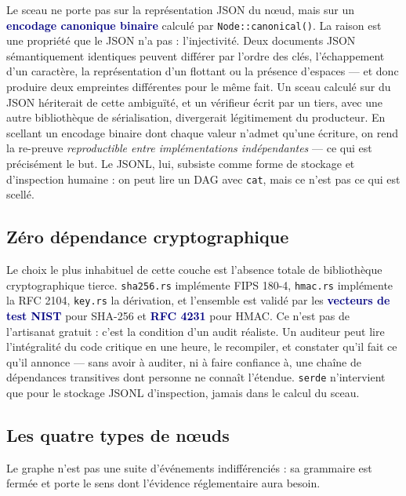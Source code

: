 \documentclass[10pt]{article}
\newcommand{\code}[1]{\texttt{\small #1}}
\newcommand{\mm}[1]{\textbf{\textcolor{navy}{#1}}}
\begin{document}
Le sceau ne porte pas sur la représentation JSON du nœud, mais sur un \mm{encodage canonique binaire} calculé par \code{Node::canonical()}. La raison est une propriété que le JSON n'a pas : l'injectivité. Deux documents JSON sémantiquement identiques peuvent différer par l'ordre des clés, l'échappement d'un caractère, la représentation d'un flottant ou la présence d'espaces — et donc produire deux empreintes différentes pour le même fait. Un sceau calculé sur du JSON hériterait de cette ambiguïté, et un vérifieur écrit par un tiers, avec une autre bibliothèque de sérialisation, divergerait légitimement du producteur. En scellant un encodage binaire dont chaque valeur n'admet qu'une écriture, on rend la re-preuve \emph{reproductible entre implémentations indépendantes} — ce qui est précisément le but. Le JSONL, lui, subsiste comme forme de stockage et d'inspection humaine : on peut lire un DAG avec \code{cat}, mais ce n'est pas ce qui est scellé.

\subsection{Zéro dépendance cryptographique}

Le choix le plus inhabituel de cette couche est l'absence totale de bibliothèque cryptographique tierce. \code{sha256.rs} implémente FIPS 180-4, \code{hmac.rs} implémente la RFC 2104, \code{key.rs} la dérivation, et l'ensemble est validé par les \mm{vecteurs de test NIST} pour SHA-256 et \mm{RFC 4231} pour HMAC. Ce n'est pas de l'artisanat gratuit : c'est la condition d'un audit réaliste. Un auditeur peut lire l'intégralité du code critique en une heure, le recompiler, et constater qu'il fait ce qu'il annonce — sans avoir à auditer, ni à faire confiance à, une chaîne de dépendances transitives dont personne ne connaît l'étendue. \code{serde} n'intervient que pour le stockage JSONL d'inspection, jamais dans le calcul du sceau.

\subsection{Les quatre types de nœuds}

Le graphe n'est pas une suite d'événements indifférenciés : sa grammaire est fermée et porte le sens dont l'évidence réglementaire aura besoin.
\end{document}
